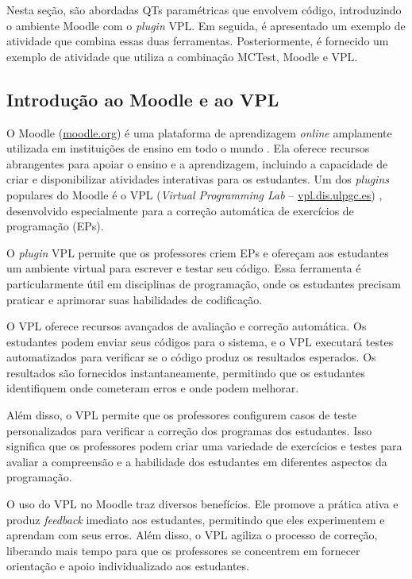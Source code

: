Nesta seção, são abordadas QTs paramétricas que envolvem código, introduzindo o ambiente Moodle com o \textit{plugin} VPL. Em seguida, é apresentado um exemplo de atividade que combina essas duas ferramentas. Posteriormente, é fornecido um exemplo de atividade que utiliza a combinação MCTest, Moodle e VPL.

\subsection{Introdução ao Moodle e ao VPL}

O Moodle (\href{www.moodle.org}{moodle.org}) é uma plataforma de aprendizagem \textit{online} amplamente utilizada em instituições de ensino em todo o mundo \cite{presedo2015calibracion}. Ela oferece recursos abrangentes para apoiar o ensino e a aprendizagem, incluindo a capacidade de criar e disponibilizar atividades interativas para os estudantes. Um dos \textit{plugins} populares do Moodle é o VPL (\textit{Virtual Programming Lab} -- \href{https://vpl.dis.ulpgc.es/}{vpl.dis.ulpgc.es}) \cite{rodriguez2012virtual}, desenvolvido especialmente para a correção automática de exercícios de programação (EPs).

O \textit{plugin} VPL permite que os professores criem EPs e ofereçam aos estudantes um ambiente virtual para escrever e testar seu código. Essa ferramenta é particularmente útil em disciplinas de programação, onde os estudantes precisam praticar e aprimorar suas habilidades de codificação.

O VPL oferece recursos avançados de avaliação e correção automática. Os estudantes podem enviar seus códigos para o sistema, e o VPL executará testes automatizados para verificar se o código produz os resultados esperados. Os resultados são fornecidos instantaneamente, permitindo que os estudantes identifiquem onde cometeram erros e onde podem melhorar.

Além disso, o VPL permite que os professores configurem casos de teste personalizados para verificar a correção dos programas dos estudantes. Isso significa que os professores podem criar uma variedade de exercícios e testes para avaliar a compreensão e a habilidade dos estudantes em diferentes aspectos da programação.

O uso do VPL no Moodle traz diversos benefícios. Ele promove a prática ativa e produz \textit{feedback} imediato aos estudantes, permitindo que eles experimentem e aprendam com seus erros. Além disso, o VPL agiliza o processo de correção, liberando mais tempo para que os professores se concentrem em fornecer orientação e apoio individualizado aos estudantes.

